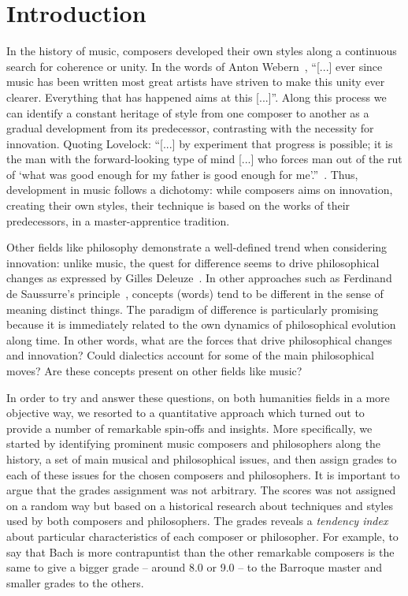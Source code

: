 \documentclass[
 aip,
 jmp,
 amsmath,amssymb,
 reprint,
]{revtex4-1}
\begin{document}
\section{\label{sec:level1}Introduction}
In the history of music, composers developed their own styles along a
continuous search for coherence or unity. In the words of Anton
Webern~\cite{Webern}, ``[...] ever since music has been written most great artists
have striven to make this unity ever clearer. Everything that has
happened aims at this [...]''. Along this process we can identify
a constant heritage of style from one composer to another as
a gradual development from its
predecessor, contrasting with the necessity for innovation. Quoting
Lovelock: 
``[...] by experiment that progress is possible; it is the man
with the forward-looking type of mind [...] who forces man out of the
rut of `what was good enough for my father is good enough for me'.''~\cite{Lovelock}.
Thus, development in music follows a dichotomy: while composers aims on
innovation, creating their own styles, their technique is based on the
works of their predecessors, in a master-apprentice tradition.

Other fields like philosophy demonstrate
a well-defined trend when considering innovation: unlike music, the
quest for difference seems to drive philosophical
changes as expressed by Gilles Deleuze~\cite{Deleuze}. In other approaches such as Ferdinand de
Saussurre's principle~\cite{Saussure}, concepts (words) tend
to be different in the sense of meaning distinct things.  The paradigm
of difference is particularly promising because it is immediately
related to the own dynamics of philosophical evolution along time.  In
other words, what are the forces that drive philosophical changes and
innovation?  Could dialectics account for some of the main
philosophical moves? Are these concepts present on other fields like music?

In order to try and answer these questions, on both humanities fields in a more objective way, we resorted to a quantitative approach which turned out to provide a number of remarkable spin-offs and insights. More specifically, we
started by identifying prominent music composers and philosophers along the history, a set of main musical and philosophical issues, and then
assign grades to each of these issues for the chosen composers and philosophers. It is important to argue that the grades assignment was not arbitrary. The scores was not assigned on a random way but based on a historical research about techniques and styles used by both composers and philosophers. The grades reveals a \emph{tendency index} about particular characteristics of each composer or philosopher. For example, to say that Bach is more contrapuntist than the other remarkable composers is the same to give a bigger grade -- around 8.0 or 9.0 -- to the Barroque master and smaller grades to the others.
\end{document}
